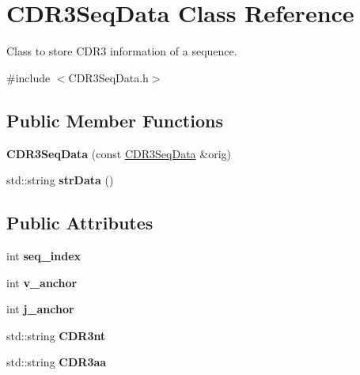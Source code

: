 \hypertarget{classCDR3SeqData}{}\section{C\+D\+R3\+Seq\+Data Class Reference}
\label{classCDR3SeqData}


Class to store C\+D\+R3 information of a sequence.  




{\ttfamily \#include $<$C\+D\+R3\+Seq\+Data.\+h$>$}

\subsection*{Public Member Functions}
\begin{DoxyCompactItemize}
\item 
\mbox{\label{classCDR3SeqData_a9e348ab1d83688bd91661ad12904f951}} 
{\bfseries C\+D\+R3\+Seq\+Data} (const \hyperlink{classCDR3SeqData}{C\+D\+R3\+Seq\+Data} \&orig)
\item 
\mbox{\label{classCDR3SeqData_a96876a00149ba49cbcfafc79a0018aab}} 
std\+::string {\bfseries str\+Data} ()
\end{DoxyCompactItemize}
\subsection*{Public Attributes}
\begin{DoxyCompactItemize}
\item 
\mbox{\label{classCDR3SeqData_a7ba4d4e76a21c1db8cdb38564a8c46d4}} 
int {\bfseries seq\+\_\+index}
\item 
\mbox{\label{classCDR3SeqData_aa31a3eda6390775b80e004711315e7ce}} 
int {\bfseries v\+\_\+anchor}
\item 
\mbox{\label{classCDR3SeqData_a3c94df2f00900c5222cf4d6cee734de1}} 
int {\bfseries j\+\_\+anchor}
\item 
\mbox{\label{classCDR3SeqData_a53d26a8a839509cb958280f1076de84b}} 
std\+::string {\bfseries C\+D\+R3nt}
\item 
\mbox{\label{classCDR3SeqData_ac7f039ed6d6ee402982e581211f1628d}} 
std\+::string {\bfseries C\+D\+R3aa}
\end{DoxyCompactItemize}


